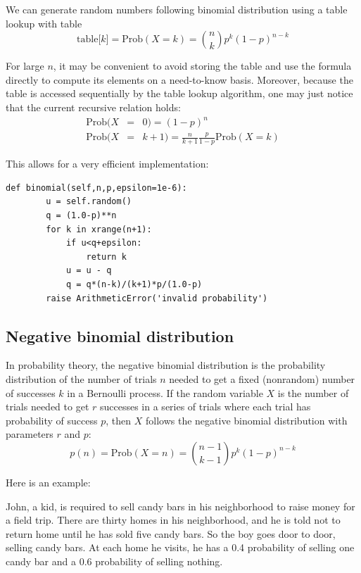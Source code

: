 \documentclass[justified,sixbynine]{tufte-book}
\def\ft{\small\tt}
\theoremstyle{plain}%
\theoremstyle{definition}
\theoremstyle{remark}
\begin{document}
\begin{fullwidth}
We can generate random numbers following binomial distribution using a table lookup with table
\begin{equation}
\text{table[}k\text{]}=\textrm{Prob}(X=k)=\binom nkp^k(1-p)^{n-k}
\end{equation}

For large $n$, it may be convenient to avoid storing the table and use the
formula directly to compute its elements on a need-to-know basis.
Moreover, because the table is accessed sequentially by the
table lookup algorithm, one may just notice that the current recursive relation holds:
\begin{eqnarray}
\textrm{Prob}(X &=&0)=(1-p)^n \\
\textrm{Prob}(X &=&k+1)=\frac n{k+1}\frac p{1-p}\textrm{Prob}(X=k)
\end{eqnarray}

This allows for a very efficient implementation:

\begin{lstlisting}[caption={in file: {\ft nlib.py}}]
    def binomial(self,n,p,epsilon=1e-6):
        u = self.random()
        q = (1.0-p)**n
        for k in xrange(n+1):
            if u<q+epsilon:
                return k
            u = u - q
            q = q*(n-k)/(k+1)*p/(1.0-p)
        raise ArithmeticError('invalid probability')
\end{lstlisting}


\goodbreak\subsection{Negative binomial distribution}

In probability theory, the negative binomial distribution is the probability
distribution of the number of trials $n$ needed to get a fixed
(nonrandom) number of successes $k$ in a Bernoulli process. If the random
variable $X$ is the number of trials needed to get $r$ successes in a series of
trials where each trial has probability of success $p$, then $X$ follows the
negative binomial distribution with parameters $r$ and $p$:
\begin{equation}
p(n)=\textrm{Prob}(X=n)=\binom{n-1}{k-1}p^k(1-p)^{n-k}
\end{equation}

Here is an example:

John, a kid, is required to sell candy bars in his neighborhood to
raise money for a field trip. There are thirty homes in his
neighborhood, and he is told not to return home until he has sold five candy bars.
So the boy goes door to door, selling candy bars. At each home he visits, he
has a 0.4 probability of selling one candy bar and a 0.6 probability of
selling nothing.


\end{fullwidth}
\end{document}
